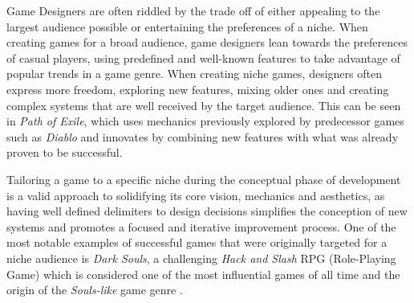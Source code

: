 


Game Designers are often riddled by the trade off of either appealing to the largest audience possible or entertaining the preferences of a niche. When creating games for a broad audience, game designers lean towards the preferences of casual players, using predefined and well-known features to take advantage of popular trends in a game genre. When creating niche games, designers often express more freedom, exploring new features, mixing older ones and creating complex systems that are well received by the target audience. This can be seen in \emph{Path of Exile}, which uses mechanics previously explored by predecessor games such as \emph{Diablo} and innovates by combining new features with what was already proven to be successful.

Tailoring a game to a specific niche during the conceptual phase of development is a valid approach to solidifying its core vision, mechanics and aesthetics, as having well defined delimiters to design decisions simplifies the conception of new systems and promotes a focused and iterative improvement process. One of the most notable examples of successful games that were originally targeted for a niche audience is \emph{Dark Souls}, a challenging \emph{Hack and Slash} RPG (Role-Playing Game) which is considered one of the most influential games of all time and  the origin of the \emph{Souls-like} game genre \cite{BOOK_DarkSoulsBeyondTheGrave}.

